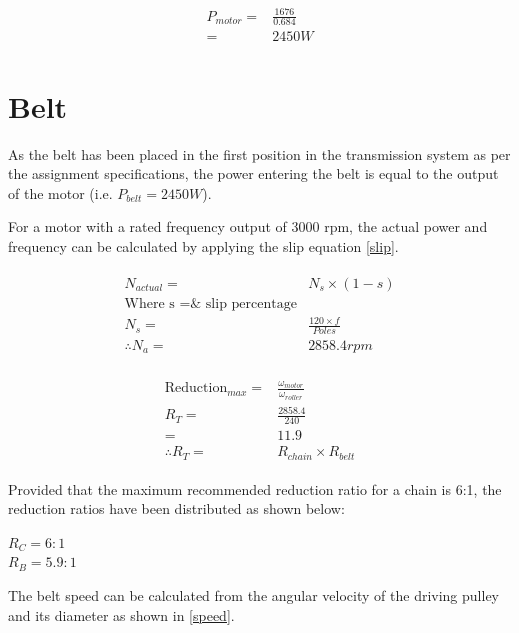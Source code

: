 \documentclass[12pt]{article}
\begin{document}
\begin{align}
    \begin{split}
        P_{motor} =& \frac{1676}{0.684} \\ 
        =& 2450W
    \end{split}
\end{align}


\section{Belt}
As the belt has been placed in the first position in the transmission system as per the assignment specifications, the power entering the belt is equal to the output of the motor (i.e. $P_{belt} = 2450 W$). 

For a motor with a rated frequency output of 3000 rpm, the actual power and frequency can be calculated by applying the slip equation \ref{slip}. 

\begin{align} \label{slip}
    \begin{split}
        N_{actual} =& N_s \times (1-s) \\ 
        \text{Where s =& slip percentage} \\
        N_s =& \frac{120 \times f}{Poles} \\
        \therefore N_a =& 2858.4 rpm
    \end{split}
\end{align}

\begin{align} \label{Reduction}
    \begin{split}
    \text{Reduction}_{max} =& \frac{\omega_{motor}}{\omega_{roller}} \\
    R_T=& \frac{2858.4}{240} \\
    =& 11.9 \\
    \therefore R_T =& R_{chain} \times R_{belt} 
     \end{split}
\end{align}

Provided that the maximum recommended reduction ratio for a chain is 6:1, the reduction ratios have been distributed as shown below:

\begin{center}
    $R_C = 6:1$ \\
    $R_B = 5.9:1$ \\
\end{center}

The belt speed can be calculated from the angular velocity of the driving pulley and its diameter as shown in \ref{speed}. 
\end{document}
